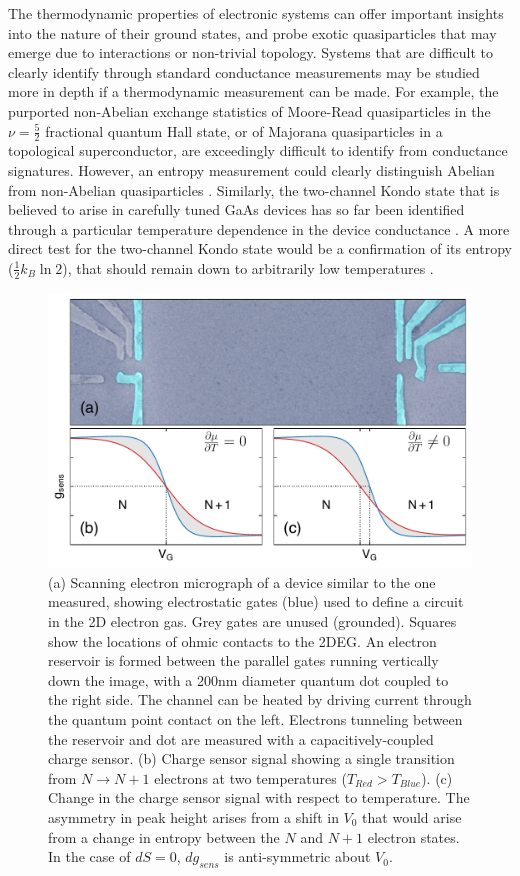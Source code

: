 \documentclass[preprint,showpacs,preprintnumbers,amsmath,amssymb,pra,aps,superscriptaddress]{revtex4-1}
\begin{document}
The thermodynamic properties of electronic systems can offer important insights into the nature of their ground states, and probe exotic quasiparticles that may emerge due to interactions or non-trivial topology.  Systems that are difficult to clearly identify through standard conductance measurements may be studied more in depth if a thermodynamic measurement can be made. For example, the purported non-Abelian exchange statistics of Moore-Read quasiparticles in the $\nu = \frac{5}{2}$ fractional quantum Hall state, or of Majorana quasiparticles in a topological superconductor, are exceedingly difficult to identify from conductance signatures. However, an entropy measurement could clearly distinguish Abelian from non-Abelian quasiparticles \cite{Cooper2009, Smirnov2015}.  Similarly, the two-channel Kondo state that is believed to arise in carefully tuned GaAs devices has so far been identified through a particular temperature dependence in the device conductance \cite{Potok2007}. A more direct test for the two-channel Kondo state would be a confirmation of its entropy ($\frac{1}{2} k_B \ln{2}$), that should remain down to arbitrarily low temperatures \cite{Alkurtass2016}.

\begin{figure}[!]
        \includegraphics[width=1.0\columnwidth]{../figures/figure_1_no-annotation.pdf}
        \caption{\label{fig:fig1}(a) Scanning electron micrograph of a device similar to the one measured, showing electrostatic gates (blue) used to define a circuit in the 2D electron gas. Grey gates are unused (grounded). Squares show the locations of ohmic contacts to the 2DEG. An electron reservoir is formed between the parallel gates running vertically down the image, with a 200nm diameter quantum dot coupled to the right side. The channel can be heated by driving current through the quantum point contact on the left. Electrons tunneling between the reservoir and dot are measured with a capacitively-coupled charge sensor. (b)  Charge sensor signal showing a single transition from $N \rightarrow N+1$ electrons at two temperatures ($T_{Red} > T_{Blue}$). (c) Change in the charge sensor signal with respect to temperature. The asymmetry in peak height arises from a shift in $V_0$ that would arise from a change in entropy between the $N$ and $N+1$ electron states. In the case of $dS=0$, $dg_{sens}$ is anti-symmetric about $V_0$.}
\end{figure}
\end{document}
